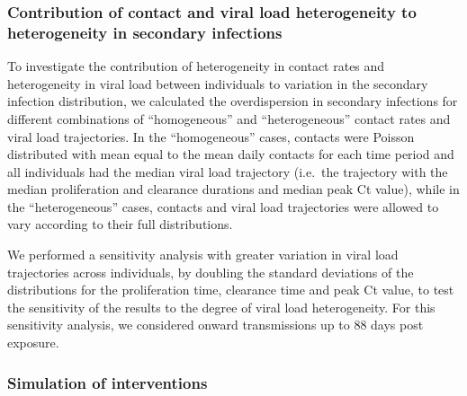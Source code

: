 \documentclass[
  10pt,
  letterpaper,
]{article}
\begin{document}
\subsubsection{Contribution of contact and viral load heterogeneity to
heterogeneity in secondary
infections}\label{contribution-of-contact-and-viral-load-heterogeneity-to-heterogeneity-in-secondary-infections}

To investigate the contribution of heterogeneity in contact rates and
heterogeneity in viral load between individuals to variation in the
secondary infection distribution, we calculated the overdispersion in
secondary infections for different combinations of ``homogeneous'' and
``heterogeneous'' contact rates and viral load trajectories. In the
``homogeneous'' cases, contacts were Poisson distributed with mean equal
to the mean daily contacts for each time period and all individuals had
the median viral load trajectory (i.e.~the trajectory with the median
proliferation and clearance durations and median peak Ct value), while
in the ``heterogeneous'' cases, contacts and viral load trajectories
were allowed to vary according to their full distributions.

We performed a sensitivity analysis with greater variation in viral load
trajectories across individuals, by doubling the standard deviations of
the distributions for the proliferation time, clearance time and peak Ct
value, to test the sensitivity of the results to the degree of viral
load heterogeneity. For this sensitivity analysis, we considered onward
transmissions up to 88 days post exposure.

\subsubsection{Simulation of
interventions}\label{simulation-of-interventions}
\end{document}
